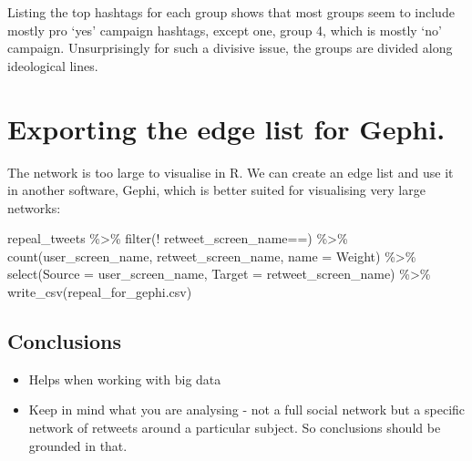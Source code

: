 \documentclass[
]{book}
\newenvironment{Shaded}{\begin{snugshade}}{\end{snugshade}}
\newcommand{\AttributeTok}[1]{\textcolor[rgb]{0.77,0.63,0.00}{#1}}
\newcommand{\FunctionTok}[1]{\textcolor[rgb]{0.00,0.00,0.00}{#1}}
\newcommand{\NormalTok}[1]{#1}
\newcommand{\SpecialCharTok}[1]{\textcolor[rgb]{0.00,0.00,0.00}{#1}}
\newcommand{\StringTok}[1]{\textcolor[rgb]{0.31,0.60,0.02}{#1}}
\begin{document}
Listing the top hashtags for each group shows that most groups seem to include mostly pro `yes' campaign hashtags, except one, group 4, which is mostly `no' campaign. Unsurprisingly for such a divisive issue, the groups are divided along ideological lines.

\hypertarget{exporting-the-edge-list-for-gephi.}{%
\section{Exporting the edge list for Gephi.}\label{exporting-the-edge-list-for-gephi.}}

The network is too large to visualise in R. We can create an edge list and use it in another software, Gephi, which is better suited for visualising very large networks:

\begin{Shaded}
\begin{Highlighting}[]
\NormalTok{repeal\_tweets }\SpecialCharTok{\%\textgreater{}\%} 
  \FunctionTok{filter}\NormalTok{(}\SpecialCharTok{!}\NormalTok{ retweet\_screen\_name}\SpecialCharTok{==}\StringTok{\textquotesingle{}\textquotesingle{}}\NormalTok{) }\SpecialCharTok{\%\textgreater{}\%} 
  \FunctionTok{count}\NormalTok{(user\_screen\_name, retweet\_screen\_name, }\AttributeTok{name =} \StringTok{\textquotesingle{}Weight\textquotesingle{}}\NormalTok{) }\SpecialCharTok{\%\textgreater{}\%} 
  \FunctionTok{select}\NormalTok{(}\AttributeTok{Source =}\NormalTok{ user\_screen\_name, }\AttributeTok{Target =}\NormalTok{ retweet\_screen\_name) }\SpecialCharTok{\%\textgreater{}\%} \FunctionTok{write\_csv}\NormalTok{(}\StringTok{\textquotesingle{}repeal\_for\_gephi.csv\textquotesingle{}}\NormalTok{)}
\end{Highlighting}
\end{Shaded}

\hypertarget{conclusions-3}{%
\subsection{Conclusions}\label{conclusions-3}}

\begin{itemize}
\item
  Helps when working with big data
\item
  Keep in mind what you are analysing - not a full social network but a specific network of retweets around a particular subject. So conclusions should be grounded in that.
\end{itemize}
\end{document}
